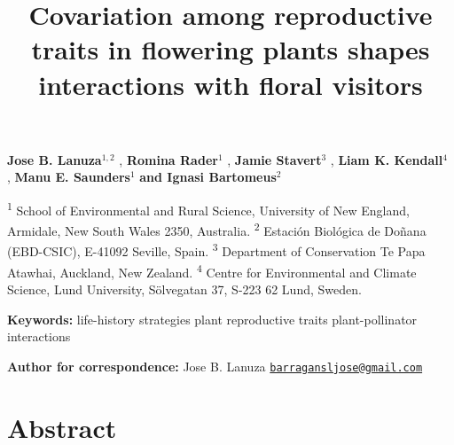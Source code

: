 \documentclass[
  12pt,
  a4paper,
]{article}
\title{\singlespacing \vspace{-1.6cm} \LARGE Covariation among reproductive traits in flowering plants shapes interactions with floral visitors}
\author{}
\date{\vspace{-2.5em}}
\begin{document}
\maketitle

\vspace{-1.4cm}

\singlespacing

\textbf{Jose B. Lanuza$^{1,2}$} , \textbf{Romina Rader$^{1}$} , \textbf{Jamie Stavert$^{3}$} , \textbf{Liam K. Kendall$^{4}$} , \textbf{Manu E. Saunders$^{1}$}  \textbf{and Ignasi Bartomeus$^{2}$} 

\small

\textsuperscript{1} School of Environmental and Rural Science, University of New England, Armidale, New South Wales 2350, Australia. \textsuperscript{2} Estación Biológica de Doñana (EBD-CSIC), E-41092 Seville, Spain. \textsuperscript{3} Department of Conservation \textbar{} Te Papa Atawhai, Auckland, New Zealand. \textsuperscript{4} Centre for Environmental and Climate Science, Lund University, Sölvegatan 37, S-223 62 Lund, Sweden.

\doublespacing
\normalsize

\textbf{Keywords:} life-history strategies \textbar{} plant reproductive traits \textbar{} plant-pollinator interactions

\textbf{Author for correspondence:} Jose B. Lanuza \textbar{} \href{mailto:barragansljose@gmail.com}{\nolinkurl{barragansljose@gmail.com}}

\hypertarget{abstract}{%
\section{Abstract}\label{abstract}}
\end{document}
